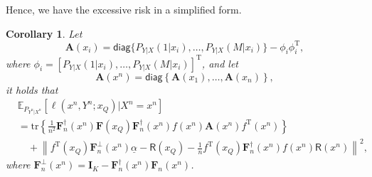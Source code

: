 \documentclass{article} %
\theoremstyle{plain} %
\newtheorem{corollary}[theorem]{Corollary}
\begin{document}
Hence, we have the excessive risk in a simplified form.
\begin{corollary}\label{col:excessive_risk_incomplete_insufficient_simple}
Let 
\[
\textbf{A}(x_i) = \mathsf{diag}\{P_{Y|X}(1|x_i),\dots,P_{Y|X}(M|x_i)\}-\phi_i\phi_i^\mathrm{T},
\]
where $\phi_i = [P_{Y|X}(1|x_i),\dots,P_{Y|X}(M|x_i)]^\mathrm{T}$, and let
\begin{equation*}
\textbf{A}(x^n) = \mathsf{diag}\left\{ \textbf{A}(x_1), \ldots, \textbf{A}(x_n) \right\},
\end{equation*}
it holds that
\begin{align*}
& \mathbb{E}_{P_{Y^n|X^n}}\left[ 
\ell \left(x^n,Y^n;x_Q\right) | X^n = x^n\right]\\
& = \mathrm{tr}\left\{ \frac1{n^2}\mathbf{F}_n^{\dagger}(x^n)\mathbf{F}(x_Q)\mathbf{F}_n^{\dagger}(x^n) f(x^n) {\mathbf{A}}(x^n) f^\mathrm{T}(x^n) \right\}\\
& \quad +
\left\| f ^{\mathrm{T}}(x_Q)\mathbf{F}_n^\perp(x^n)\underline{\alpha} - \mathsf{R}(x_Q) - \frac1n f^\mathrm{T}(x_Q)\mathbf{F}_n^{\dagger}(x^n)f(x^n)\mathsf{R}(x^n)\right\|^2,
\end{align*}
where $\mathbf{F}_n^{\perp}(x^n) = \textbf{I}_K-\mathbf{F}_n^\dagger(x^n) \mathbf{F}_n(x^n)$.
\end{corollary}
\end{document}
